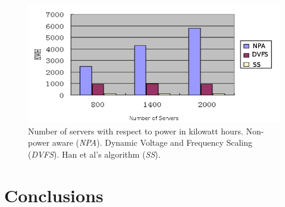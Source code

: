 \documentclass{sig-alternate}
\begin{document}

\begin{figure}[tb]
 \centering
 \includegraphics[height=0.2 \textwidth]{s4}
 \caption{Number of servers with respect to power in kilowatt hours. Non-power aware (\emph{NPA}). Dynamic Voltage and Frequency Scaling (\emph{DVFS}). Han et al's algorithm (\emph{SS}).}
 \label{fig:Results_SS}
\end{figure}

\section{Conclusions} 
\label{sec:conclusion}





\pagebreak



\end{document}
